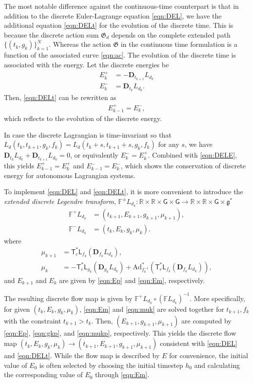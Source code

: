 \documentclass[letterpaper, 10pt, conference]{ieeeconf}
\newcommand{\G}{\ensuremath{\mathsf{G}}}
\newcommand{\T}{\ensuremath{\mathsf{T}}}
\renewcommand{\L}{\ensuremath{\mathsf{L}}}
\renewcommand{\Re}{\ensuremath{\mathbb{R}}}
\newcommand{\D}{\ensuremath{\mathbf{D}}}
\newcommand{\Ad}{\ensuremath{\mathrm{Ad}}}
\newcommand{\g}{\ensuremath{\mathfrak{g}}}
\begin{document}
The most notable difference against the continuous-time counterpart is that in addition to the discrete Euler-Lagrange equation \eqref{eqn:DEL}, we have the additional equation \eqref{eqn:DELt} for the evolution of the discrete time. 
This is because the discrete action sum $\mathfrak{G}_d$ depends on the complete extended path $\{(t_k,g_k)\}_{k=1}^N$.
Whereas the action $\mathfrak{G}$ in the continuous time formulation is a function of the associated curve \eqref{eqn:ac}.
The evolution of the discrete time is associated with the energy.
Let the discrete energies be
\begin{align}
    E^+_k &= - \D_{t_{k+1}} L_{d_k}\label{eqn:Ep}\\
    E^-_k &= \D_{t_{k}} L_{d_k}.\label{eqn:Em}
\end{align}
Then, \eqref{eqn:DELt} can be rewritten as
\begin{align}
    E^+_{k-1} = E^-_k,\label{eqn:DELE}
\end{align}
which reflects to the evolution of the discrete energy.

In case the discrete Lagrangian is time-invariant so that $L_d(t_k,t_{k+1},g_k,f_k) =  L_d(t_k+s,t_{k+1}+s,g_k,f_k)$ for any $s$, 
we have $\D_{t_k}L_{d_k} + \D_{t_{k+1}}L_{d_k}=0$, or equivalently $E^-_k = E^+_k$. 
Combined with \eqref{eqn:DELE}, this yields $E_{k-1}^+ = E_k^+$ and $E_{k-1}^-=E_k^-$, which shows the conservation of discrete energy for autonomous Lagrangian systems. 

To implement \eqref{eqn:DEL} and \eqref{eqn:DELt}, it is more convenient to introduce the \textit{extended discrete Legendre transform}, $\mathbb{F}^\pm L_{d_k}: \Re\times\Re \times \G \times \G \rightarrow \Re\times \Re\times\G\times\g^*$
\begin{align}
    \mathbb{F}^+ L_{d_k} &= (t_{k+1}, E_{k+1}, g_{k+1}, \mu_{k+1}),\\
    \mathbb{F}^- L_{d_k} &= (t_k, E_k, g_{k}, \mu_{k}).
\end{align}
where
\begin{align}
    \mu_{k+1} & = \T^*_e\L_{f_k} (\D_{f_k} L_{d_k}),\label{eqn:mukp}\\
    \mu_k & = -\T^*_e\L_{g_k}(\D_{g_k} L_{d_k})+ \Ad^*_{f_k^{-1}} (\T^*_e\L_{f_k}(\D_{f_k} L_{d_k})),\label{eqn:muk}
\end{align}
and $E_{k+1}$ and $E_k$ are given by \eqref{eqn:Ep} and \eqref{eqn:Em}, respectively. 

The resulting discrete flow map is given by $\mathbb{F}^+L_{d_k} \circ (\mathbb{F}L_{d_k})^{-1}$. 
More specifically, for given $(t_k, E_k, g_k, \mu_k)$, \eqref{eqn:Em} and \eqref{eqn:muk} are solved together for $t_{k+1},f_k$ with the constraint $t_{k+1}>t_k$.
Then, $(E_{k+1}, g_{k+1},\mu_{k+1})$ are computed by \eqref{eqn:Ep}, \eqref{eqn:gkp}, and \eqref{eqn:mukp}, respectively.
This yields the discrete flow map $(t_k, E_k, g_k, \mu_k)\rightarrow(t_{k+1}, E_{k+1}, g_{k+1}, \mu_{k+1})$ consistent with \eqref{eqn:DEL} and \eqref{eqn:DELt}.
While the flow map is described by $E$ for convenience, the initial value of $E_0$ is often selected by choosing the initial timestep $h_0$ and calculating the corresponding value of $E_0$ through \eqref{eqn:Em}.
\end{document}
